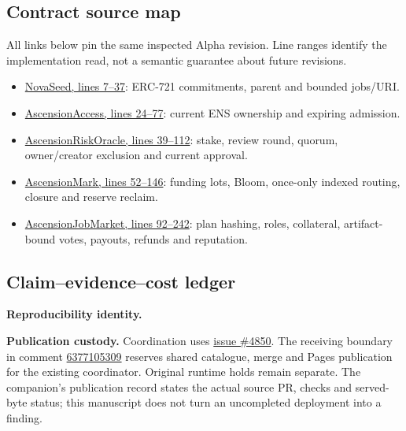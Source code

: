 \subsection{Contract source map}
All links below pin the same inspected Alpha revision. Line ranges identify the implementation read, not a semantic guarantee about future revisions.

\begin{itemize}
\item \href{https://github.com/MontrealAI/AGI-Alpha-Agent-v0/blob/197147ffd22c5ae13113162afffaf3ce9c10aa2e/contracts/ascension/NovaSeed.sol\#L7-L37}{NovaSeed, lines 7--37}: ERC-721 commitments, parent and bounded jobs/URI.
\item \href{https://github.com/MontrealAI/AGI-Alpha-Agent-v0/blob/197147ffd22c5ae13113162afffaf3ce9c10aa2e/contracts/ascension/AscensionAccess.sol\#L24-L77}{AscensionAccess, lines 24--77}: current ENS ownership and expiring admission.
\item \href{https://github.com/MontrealAI/AGI-Alpha-Agent-v0/blob/197147ffd22c5ae13113162afffaf3ce9c10aa2e/contracts/ascension/AscensionRiskOracle.sol\#L39-L112}{AscensionRiskOracle, lines 39--112}: stake, review round, quorum, owner/creator exclusion and current approval.
\item \href{https://github.com/MontrealAI/AGI-Alpha-Agent-v0/blob/197147ffd22c5ae13113162afffaf3ce9c10aa2e/contracts/ascension/AscensionMark.sol\#L52-L146}{AscensionMark, lines 52--146}: funding lots, Bloom, once-only indexed routing, closure and reserve reclaim.
\item \href{https://github.com/MontrealAI/AGI-Alpha-Agent-v0/blob/197147ffd22c5ae13113162afffaf3ce9c10aa2e/contracts/ascension/AscensionJobMarket.sol\#L92-L242}{AscensionJobMarket, lines 92--242}: plan hashing, roles, collateral, artifact-bound votes, payouts, refunds and reputation.
\end{itemize}

\subsection{Claim--evidence--cost ledger}
\ClaimLedger

\textbf{Reproducibility identity.} \FreezeIdentity

\textbf{Publication custody.} Coordination uses \href{https://github.com/MontrealAI/AGI-Alpha-Agent-v0/issues/4850}{issue \#4850}. The receiving boundary in comment \href{https://github.com/MontrealAI/AGI-Alpha-Agent-v0/issues/4850\#issuecomment-6377105309}{6377105309} reserves shared catalogue, merge and Pages publication for the existing coordinator. Original runtime holds remain separate. The companion's publication record states the actual source PR, checks and served-byte status; this manuscript does not turn an uncompleted deployment into a finding.

